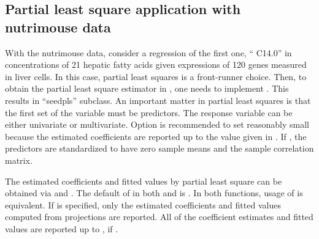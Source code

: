 
\subsection{Partial least square application with {\sf nutrimouse} data}
With the nutrimouse data, consider a regression of the first one, `` C14.0''
in concentrations of 21 hepatic fatty acids given expressions
of 120 genes measured in liver cells.
In this case, partial least squares is a front-runner choice.
Then, to obtain the partial least square estimator in ,
one needs to implement .
This results in ``seedpls'' subclass.
An important matter in partial least squares is
that the first set of the variable must be predictors.
The response variable can be either univariate or multivariate.
Option  is recommended to set reasonably small 
because the estimated coefficients are reported up to
the value given in .
If , the predictors are standardized
to have zero sample means and the sample correlation matrix.

The estimated coefficients and fitted values by partial least square can be obtained
via  and .
The default of  in both  and  is .
In both functions, usage of  is equivalent.
If  is specified,  only the estimated coefficients and fitted values
computed from  projections are reported.
All of the coefficient estimates and fitted values are reported up to  ,
if .

